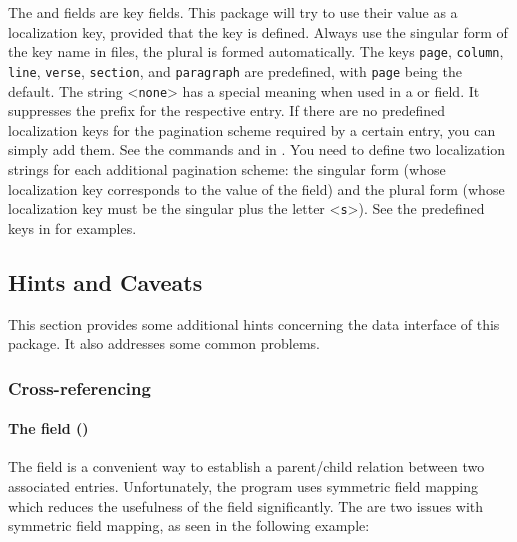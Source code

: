 \documentclass{ltxdockit}[2011/03/25]
\begin{document}
The  and  fields are key fields. This package will try to use their value as a localization key, provided that the key is defined. Always use the singular form of the key name in  files, the plural is formed automatically. The keys \texttt{page}, \texttt{column}, \texttt{line}, \texttt{verse}, \texttt{section}, and \texttt{paragraph} are predefined, with \texttt{page} being the default. The string <\texttt{none}> has a special meaning when used in a  or  field. It suppresses the prefix for the respective entry. If there are no predefined localization keys for the pagination scheme required by a certain entry, you can simply add them. See the commands  and  in . You need to define two localization strings for each additional pagination scheme: the singular form (whose localization key corresponds to the value of the  field) and the plural form (whose localization key must be the singular plus the letter <\texttt{s}>). See the predefined keys in  for examples.

\subsection{Hints and Caveats}
\label{bib:cav}

This section provides some additional hints concerning the data interface of this package. It also addresses some common problems.

\subsubsection{Cross-referencing}
\label{bib:cav:ref}

\paragraph{The  field (\bibtex)}
\label{bib:cav:ref:btx}

The  field is a convenient way to establish a parent\slash child relation between two associated entries. Unfortunately, the \bibtex program uses symmetric field mapping which reduces the usefulness of the  field significantly. The are two issues with symmetric field mapping, as seen in the following example:
\end{document}
